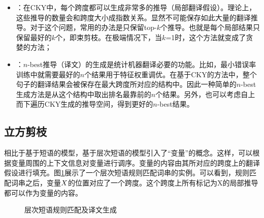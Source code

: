 \begin{itemize}
\vspace{0.5em}
\item {\small{}}：在CKY中，每个跨度都可以生成非常多的推导（局部翻译假设）。理论上，这些推导的数量会和跨度大小成指数关系。显然不可能保存如此大量的翻译推导。对于这个问题，常用的办法是只保留top-$k$个推导。也就是每个局部结果只保留最好的$k$个，即束剪枝。在极端情况下，当$k$=1时，这个方法就变成了贪婪的方法；
\vspace{0.5em}
\item {\small{}}：$n$-best推导（译文）的生成是统计机器翻译必要的功能。比如，最小错误率训练中就需要最好的$n$个结果用于特征权重调优。在基于CKY的方法中，整个句子的翻译结果会被保存在最大跨度所对应的结构中。因此一种简单的$n$-best生成方法是从这个结构中取出排名最靠前的$n$个结果。另外，也可以考虑自上而下遍历CKY生成的推导空间，得到更好的$n$-best结果。
\end{itemize}

\subsection{立方剪枝}

\parinterval 相比于基于短语的模型，基于层次短语的模型引入了“变量”的概念。这样，可以根据变量周围的上下文信息对变量进行调序。变量的内容由其所对应的跨度上的翻译假设进行填充。图\ref{fig:8-11}展示了一个层次短语规则匹配词串的实例。可以看到，规则匹配词串之后，变量${X}$的位置对应了一个跨度。这个跨度上所有标记为X的局部推导都可以作为变量的内容。
\vspace{-0.5em}
\begin{figure}[htp]
\centering

\setlength{\abovecaptionskip}{-0.5em}
\setlength{\belowcaptionskip}{-0.5em}
\caption{层次短语规则匹配及译文生成}
\label{fig:8-11}
\end{figure}

